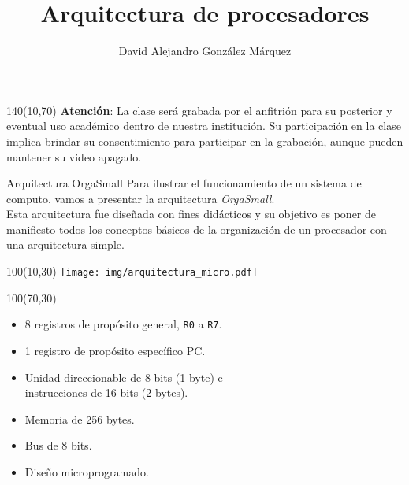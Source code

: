 \documentclass[aspectratio=169]{beamer}
\title{\Huge Arquitectura de procesadores}
\author{David Alejandro González Márquez}
\date{}
\begin{document}
\begin{frame}[plain]
    \titlepage
    \begin{textblock}{140}(10,70)
    \textcolor{rojo}{
    \textbf{Atención}: La clase será grabada por el anfitrión para su posterior y eventual uso académico dentro de nuestra institución. Su participación en la clase implica brindar su consentimiento para participar en la grabación, aunque pueden mantener su video apagado.}
    \end{textblock}
\end{frame}

\begin{frame}[fragile,t]{Arquitectura OrgaSmall}
    \small
    Para ilustrar el funcionamiento de un sistema de computo, vamos a presentar la arquitectura \emph{OrgaSmall}.\\
    \vspace{0.2cm}
    Esta arquitectura fue diseñada con fines didácticos y su objetivo es poner de manifiesto todos los conceptos básicos de la organización de un procesador con una arquitectura simple.\\
    \bigskip    
    \begin{textblock}{100}(10,30)
    \texttt{[image: img/arquitectura\_micro.pdf]}
    \end{textblock}
    \begin{textblock}{100}(70,30)
    \begin{itemize}
    \item 8 registros de propósito general, \texttt{R0} a \texttt{R7}.
    \item 1 registro de propósito específico PC.
    \item Unidad direccionable de 8 bits (1 byte) e \\ instrucciones de 16 bits (2 bytes).
    \item Memoria de 256 bytes.
    \item Bus de 8 bits.
    \item Diseño microprogramado.
    \end{itemize}
    \end{textblock}
\end{frame}
\end{document}
